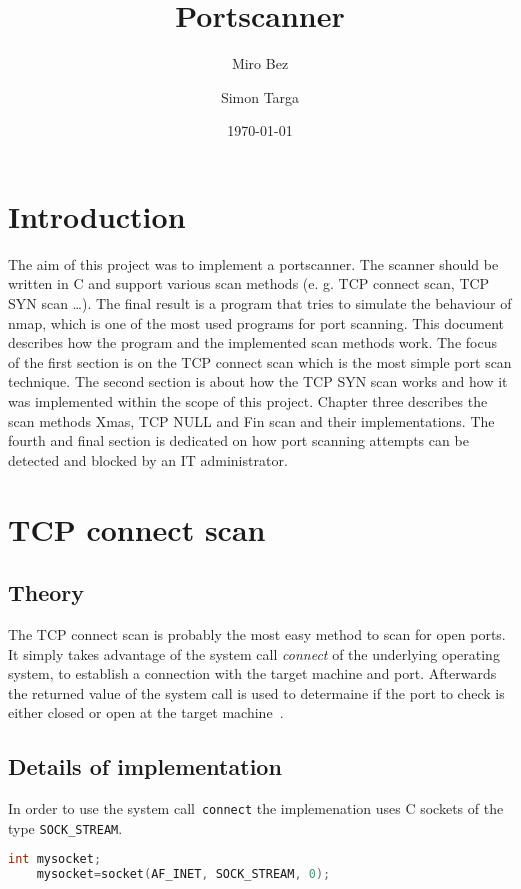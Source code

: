\documentclass[a4paper]{scrartcl}
\begin{document}
	\title{Portscanner} \author{Miro Bez \and  Simon Targa} \date{\today} \maketitle
	\tableofcontents
	\newpage

	\section*{Introduction}
	The aim of this project was to implement a portscanner. The scanner should be written in C and support various scan methods (e. g. TCP connect scan, TCP SYN scan \dots).
	The final result is a program that tries to simulate the behaviour of nmap, which is one of the most used programs for port scanning. This document
	describes how the program and the implemented scan methods work. The focus of the first section is on the TCP connect scan which is the most simple port scan technique. The second
	section is about how the TCP SYN scan works and how it was implemented within the scope of this project. Chapter three describes the scan methods Xmas, TCP NULL and Fin scan and their
	implementations. The fourth and final section is dedicated on how port scanning attempts can be detected and blocked by an IT administrator.
	
	
	\section{TCP connect scan}
	\subsection{Theory}
	The TCP connect scan is probably the most easy method to scan for open ports. It simply takes advantage of the system call
	\textit{connect} of the underlying operating system, to establish a connection with the target machine and port. Afterwards the
	returned value of the system call is used to determaine if the port to check is either closed or open at the target machine~\cite{nmap2009}. 
	
	
	\subsection{Details of implementation}
	In order to use the system call~\lstinline{connect} the implemenation uses C sockets of the type \lstinline|SOCK_STREAM|. 
	\begin{lstlisting}[frame= single, language=C, caption=Code to create C socket of type \lstinline|SOCK_STREAM|]
	int mysocket;
	mysocket=socket(AF_INET, SOCK_STREAM, 0);
	\end{lstlisting}
	
\end{document}
